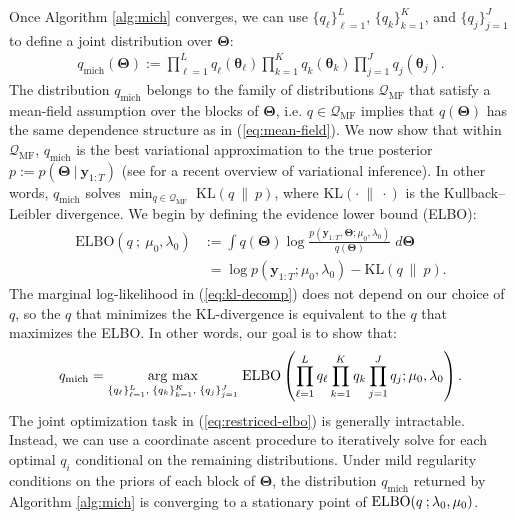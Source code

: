 Once Algorithm \ref{alg:mich} converges, we can use $\{q_\ell\}_{\ell=1}^L$, $\{q_k\}_{k=1}^K$, and $\{q_j\}_{j=1}^J$ to define a joint distribution over $\boldsymbol{\Theta}$:
\begin{align}\label{eq:mean-field}
    q_{\text{mich}}(\boldsymbol{\Theta}) := \prod_{\ell=1}^L q_\ell(\boldsymbol{\theta}_\ell)\prod_{k=1}^K q_k(\boldsymbol{\theta}_k) \prod_{j=1}^J q_j(\boldsymbol{\theta}_j).
\end{align}
The distribution $q_{\text{mich}}$ belongs to the family of distributions $\mathcal{Q}_{\text{MF}}$ that satisfy a mean-field assumption over the blocks of $\boldsymbol{\Theta}$, i.e. $q \in \mathcal{Q}_{\text{MF}}$ implies that $q(\boldsymbol{\Theta})$ has the same dependence structure as in (\ref{eq:mean-field}). We now show that within $\mathcal{Q}_{\text{MF}}$, $q_{\text{mich}}$ is the best variational approximation to the true posterior $p:=p(\boldsymbol{\Theta}\:|\:\mathbf{y}_{1:T})$ (see \cite{Blei17} for a recent overview of variational inference). In other words, $ q_{\text{mich}}$ solves $\min_{q \in  \mathcal{Q}_{\text{MF}}}  \; \text{KL}( q \:\lVert\: p)$, where $\text{KL}( \cdot\:\lVert\: \cdot )$ is the Kullback–Leibler divergence. We begin by defining the evidence lower bound (ELBO):
\begin{align}
    \text{ELBO}(q\:;\:\mu_0,\lambda_0) &:= \int q(\boldsymbol{\Theta}) \log \frac{ p(\mathbf{y}_{1:T},\boldsymbol{\Theta};\mu_0,\lambda_0)}{q(\boldsymbol{\Theta})} \; d\boldsymbol{\Theta} \label{eq:elbo}\\
    &\;= \log p(\mathbf{y}_{1:T};\mu_0,\lambda_0) - \text{KL}( q \:\lVert\: p)\label{eq:kl-decomp}.
\end{align}
The marginal log-likelihood in (\ref{eq:kl-decomp}) does not depend on our choice of $q$, so the $q$ that minimizes the KL-divergence is equivalent to the $q$ that maximizes the ELBO. In other words, our goal is to show that:
\begin{align} \label{eq:restriced-elbo}
    q_{\text{mich}} = \underset{\{q_\ell\}_{\ell=1}^L,\; \{q_k\}_{k=1}^K,\; \{q_j\}_{j=1}^J}{\text{\normalfont arg max}}  \; \text{ELBO}\left(\prod_{\ell=1}^L q_\ell \prod_{k=1}^K q_k \prod_{j=1}^J q_j;\mu_0,\lambda_0\right).
\end{align}
The joint optimization task in (\ref{eq:restriced-elbo}) is generally intractable. Instead, we can use a coordinate ascent procedure to iteratively solve for each optimal $q_i$ conditional on the remaining distributions. Under mild regularity conditions on the priors of each block of $\boldsymbol{\Theta}$, the distribution $q_{\text{mich}}$ returned by Algorithm \ref{alg:mich} is converging to a stationary point of $\text{\normalfont ELBO}(q\:;\lambda_0, \mu_0)$.

